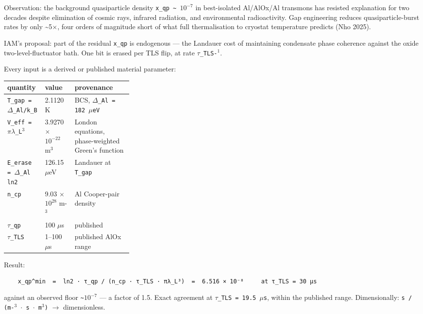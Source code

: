 \documentclass[12pt,a4paper]{article}
\begin{document}
Observation: the background quasiparticle density \texttt{x\_qp \textasciitilde{} $10^{-7}$} in best-isolated Al/AlOx/Al transmons has resisted explanation for two decades despite elimination of cosmic rays, infrared radiation, and environmental radioactivity. Gap engineering reduces quasiparticle-burst rates by only \textasciitilde{}5$\times$, four orders of magnitude short of what full thermalisation to cryostat temperature predicts (Nho 2025).


IAM's proposal: part of the residual \texttt{x\_qp} is endogenous --- the Landauer cost of maintaining condensate phase coherence against the oxide two-level-fluctuator bath. One bit is erased per TLS flip, at rate \texttt{$\tau$\_TLS-$^{1}$}.


Every input is a derived or published material parameter:


\begin{small}
\begin{tabularx}{\linewidth}{L{0.30\linewidth}YY}
\toprule
\textbf{quantity} & \textbf{value} & \textbf{provenance} \\
\midrule
\texttt{T\_\allowbreak{}gap = $\Delta$\_\allowbreak{}Al/\allowbreak{}k\_\allowbreak{}B} & 2.1120 K & BCS, \texttt{$\Delta$\_\allowbreak{}Al = 182 $\mu$eV} \\
\texttt{V\_\allowbreak{}eff = $\pi\lambda$\_\allowbreak{}L$^{3}$} & 3.9270 $\times$ $10^{-22}$ m$^{3}$ & London equations, phase-weighted Green's function \\
\texttt{E\_\allowbreak{}erase = $\Delta$\_\allowbreak{}Al ln2} & 126.15 $\mu$eV & Landauer at \texttt{T\_\allowbreak{}gap} \\
\texttt{n\_\allowbreak{}cp} & 9.03 $\times$ $10^{28}$ m-$^{3}$ & Al Cooper-pair density \\
\texttt{$\tau$\_\allowbreak{}qp} & 100 $\mu$s & published \\
\texttt{$\tau$\_\allowbreak{}TLS} & 1--100 $\mu$s & published AlOx range \\
\bottomrule
\end{tabularx}
\end{small}


Result:


\begin{lstlisting}
    x_qp^min  =  ln2 · τ_qp / (n_cp · τ_TLS · πλ_L³)  =  6.516 × 10⁻⁸     at τ_TLS = 30 µs
\end{lstlisting}


against an observed floor \texttt{\textasciitilde{}$10^{-7}$} --- a factor of 1.5. Exact agreement at \texttt{$\tau$\_TLS = 19.5 $\mu$s}, within the published range. Dimensionally: \texttt{s / (m-$^{3}$ $\cdot$ s $\cdot$ m$^{3}$)} $\rightarrow$ dimensionless.
\end{document}
